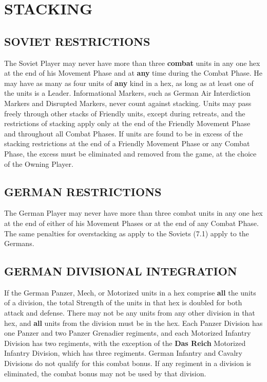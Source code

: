 \section{STACKING}

\subsection{SOVIET RESTRICTIONS}

The Soviet Player may never have more than three \textbf{combat} units in any one hex at the end of his Movement Phase and at \textbf{any} time during the Combat Phase. He may have as many as four units of \textbf{any} kind in a hex, as long as at least one of the units is a Leader. Informational Markers, such as German Air Interdiction Markers and Disrupted Markers, never count against stacking. Units may pass freely through other stacks of Friendly units, except during retreats, and the restrictions of stacking apply only at the end of the Friendly Movement Phase and throughout all Combat Phases. If units are found to be in excess of the stacking restrictions at the end of a Friendly Movement Phase or any Combat Phase, the excess must be eliminated and removed from the game, at the choice of the Owning Player.

\subsection{GERMAN RESTRICTIONS}

The German Player may never have more than three combat units in any one hex at the end of either of his Movement Phases or at the end of any Combat Phase. The same penalties for overstacking as apply to the Soviets (7.1) apply to the Germans.

\begin{flushleft}
  \subsection{GERMAN DIVISIONAL INTEGRATION}
\end{flushleft}

If the German Panzer, Mech, or Motorized units in a hex comprise \textbf{all} the units of a division, the total Strength of the units in that hex is doubled for both attack and defense. There may not be any units from any other division in that hex, and \textbf{all} units from the division must be in the hex. Each Panzer Division has one Panzer and two Panzer Grenadier regiments, and each Motorized Infantry Division has two regiments, with the exception of the \textbf{Das Reich} Motorized Infantry Division, which has three regiments. German Infantry and Cavalry Divisions do not qualify for this combat bonus. If any regiment in a division is eliminated, the combat bonus may not be used by that division.